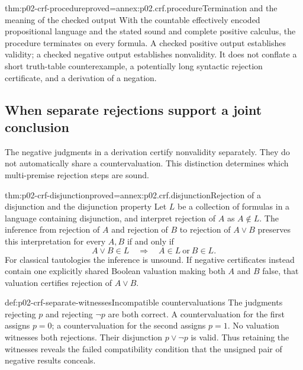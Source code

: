 \begin{hbtheorem}{thm:p02-crf-procedure}{proved=annex:p02.crf.procedure}{Termination and the meaning of the checked output}
With the countable effectively encoded propositional language and
the stated sound and complete positive calculus, the procedure
terminates on every formula. A checked positive output establishes
validity; a checked negative output establishes nonvalidity.
It does not conflate a short truth-table counterexample, a potentially
long syntactic rejection certificate, and a derivation of a negation.
\end{hbtheorem}

\subsection{When separate rejections support a joint conclusion}
\label{sec:p02-crf-joint-rejection}

The negative judgments in a derivation certify nonvalidity separately.
They do not automatically share a countervaluation. This distinction
determines which multi-premise rejection steps are sound.

\begin{hbtheorem}{thm:p02-crf-disjunction}{proved=annex:p02.crf.disjunction}{Rejection of a disjunction and the disjunction property}
Let \(L\) be a collection of formulas in a language containing disjunction,
and interpret rejection of \(A\) as \(A\notin L\). The inference from
rejection of \(A\) and rejection of \(B\) to rejection of \(A\lor B\)
preserves this interpretation for every \(A,B\) if and only if
\[
 A\lor B\in L\quad\Longrightarrow\quad A\in L\ \text{or}\ B\in L.
\]
For classical tautologies the inference is unsound. If negative
certificates instead contain one explicitly shared Boolean valuation
making both \(A\) and \(B\) false, that valuation certifies rejection of
\(A\lor B\).
\end{hbtheorem}

\begin{hbexample}{def:p02-crf-separate-witnesses}{Incompatible countervaluations}
The judgments rejecting \(p\) and rejecting \(\neg p\) are both correct.
A countervaluation for the first assigns \(p=0\); a countervaluation for
the second assigns \(p=1\). No valuation witnesses both rejections.
Their disjunction \(p\lor\neg p\) is valid. Thus retaining the witnesses
reveals the failed compatibility condition that the unsigned pair of
negative results conceals.
\end{hbexample}

